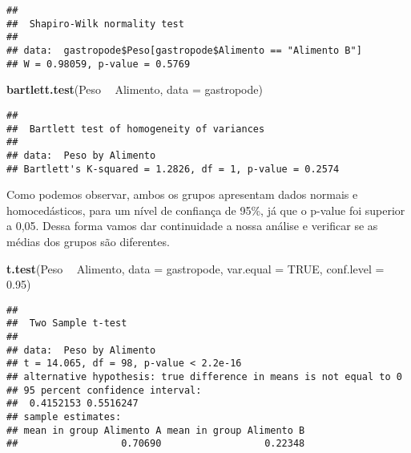 \documentclass[titlepage, oneside, openany, a4paper]{book}
\newenvironment{Shaded}{\begin{snugshade}}{\end{snugshade}}
\newcommand{\DataTypeTok}[1]{\textcolor[rgb]{0.13,0.29,0.53}{#1}}
\newcommand{\FloatTok}[1]{\textcolor[rgb]{0.00,0.00,0.81}{#1}}
\newcommand{\KeywordTok}[1]{\textcolor[rgb]{0.13,0.29,0.53}{\textbf{#1}}}
\newcommand{\NormalTok}[1]{#1}
\newcommand{\OperatorTok}[1]{\textcolor[rgb]{0.81,0.36,0.00}{\textbf{#1}}}
\newcommand{\OtherTok}[1]{\textcolor[rgb]{0.56,0.35,0.01}{#1}}
\newcommand{\StringTok}[1]{\textcolor[rgb]{0.31,0.60,0.02}{#1}}
\begin{document}
\begin{Shaded}
\end{Shaded}

\begin{verbatim}
## 
##  Shapiro-Wilk normality test
## 
## data:  gastropode$Peso[gastropode$Alimento == "Alimento B"]
## W = 0.98059, p-value = 0.5769
\end{verbatim}

\begin{Shaded}
\begin{Highlighting}[]
\KeywordTok{bartlett.test}\NormalTok{(Peso }\OperatorTok{~}\StringTok{ }\NormalTok{Alimento, }\DataTypeTok{data =}\NormalTok{ gastropode)}
\end{Highlighting}
\end{Shaded}

\begin{verbatim}
## 
##  Bartlett test of homogeneity of variances
## 
## data:  Peso by Alimento
## Bartlett's K-squared = 1.2826, df = 1, p-value = 0.2574
\end{verbatim}

Como podemos observar, ambos os grupos apresentam dados normais e homocedásticos, para um nível de confiança de 95\%, já que o p-value foi superior a 0,05. Dessa forma vamos dar continuidade a nossa análise e verificar se as médias dos grupos são diferentes.

\begin{Shaded}
\begin{Highlighting}[]
\KeywordTok{t.test}\NormalTok{(Peso }\OperatorTok{~}\StringTok{ }\NormalTok{Alimento, }
       \DataTypeTok{data =}\NormalTok{ gastropode,}
       \DataTypeTok{var.equal =} \OtherTok{TRUE}\NormalTok{,}
       \DataTypeTok{conf.level =} \FloatTok{0.95}\NormalTok{)}
\end{Highlighting}
\end{Shaded}

\begin{verbatim}
## 
##  Two Sample t-test
## 
## data:  Peso by Alimento
## t = 14.065, df = 98, p-value < 2.2e-16
## alternative hypothesis: true difference in means is not equal to 0
## 95 percent confidence interval:
##  0.4152153 0.5516247
## sample estimates:
## mean in group Alimento A mean in group Alimento B 
##                  0.70690                  0.22348
\end{verbatim}
\end{document}
